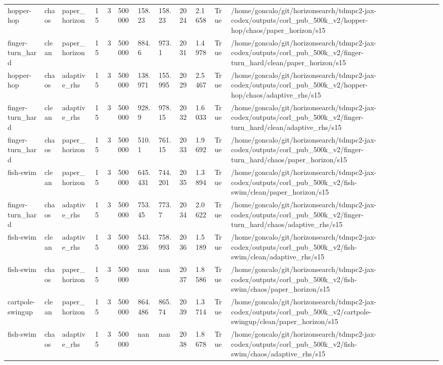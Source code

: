 \begin{tabular}{llllllllllll}
hopper-hop & chaos & paper\_horizon & 15 & 3 & 500000 & 158.23 & 158.23 & 2024 & 2.1658 & True & /home/goncalo/git/horizonsearch/tdmpc2-jax-codex/outputs/corl\_pub\_500k\_v2/hopper-hop/chaos/paper\_horizon/s15 \\
finger-turn\_hard & clean & paper\_horizon & 15 & 3 & 500000 & 884.6 & 973.1 & 2031 & 1.4978 & True & /home/goncalo/git/horizonsearch/tdmpc2-jax-codex/outputs/corl\_pub\_500k\_v2/finger-turn\_hard/clean/paper\_horizon/s15 \\
hopper-hop & chaos & adaptive\_rhs & 15 & 3 & 500000 & 138.971 & 155.995 & 2029 & 2.5467 & True & /home/goncalo/git/horizonsearch/tdmpc2-jax-codex/outputs/corl\_pub\_500k\_v2/hopper-hop/chaos/adaptive\_rhs/s15 \\
finger-turn\_hard & clean & adaptive\_rhs & 15 & 3 & 500000 & 928.9 & 978.15 & 2032 & 1.6033 & True & /home/goncalo/git/horizonsearch/tdmpc2-jax-codex/outputs/corl\_pub\_500k\_v2/finger-turn\_hard/clean/adaptive\_rhs/s15 \\
finger-turn\_hard & chaos & paper\_horizon & 15 & 3 & 500000 & 510.1 & 761.15 & 2033 & 1.9692 & True & /home/goncalo/git/horizonsearch/tdmpc2-jax-codex/outputs/corl\_pub\_500k\_v2/finger-turn\_hard/chaos/paper\_horizon/s15 \\
fish-swim & clean & paper\_horizon & 15 & 3 & 500000 & 645.431 & 744.201 & 2035 & 1.3894 & True & /home/goncalo/git/horizonsearch/tdmpc2-jax-codex/outputs/corl\_pub\_500k\_v2/fish-swim/clean/paper\_horizon/s15 \\
finger-turn\_hard & chaos & adaptive\_rhs & 15 & 3 & 500000 & 753.45 & 773.7 & 2034 & 2.0622 & True & /home/goncalo/git/horizonsearch/tdmpc2-jax-codex/outputs/corl\_pub\_500k\_v2/finger-turn\_hard/chaos/adaptive\_rhs/s15 \\
fish-swim & clean & adaptive\_rhs & 15 & 3 & 500000 & 543.236 & 758.993 & 2036 & 1.5189 & True & /home/goncalo/git/horizonsearch/tdmpc2-jax-codex/outputs/corl\_pub\_500k\_v2/fish-swim/clean/adaptive\_rhs/s15 \\
fish-swim & chaos & paper\_horizon & 15 & 3 & 500000 & nan & nan & 2037 & 1.8586 & True & /home/goncalo/git/horizonsearch/tdmpc2-jax-codex/outputs/corl\_pub\_500k\_v2/fish-swim/chaos/paper\_horizon/s15 \\
cartpole-swingup & clean & paper\_horizon & 15 & 3 & 500000 & 864.486 & 865.74 & 2039 & 1.3714 & True & /home/goncalo/git/horizonsearch/tdmpc2-jax-codex/outputs/corl\_pub\_500k\_v2/cartpole-swingup/clean/paper\_horizon/s15 \\
fish-swim & chaos & adaptive\_rhs & 15 & 3 & 500000 & nan & nan & 2038 & 1.8678 & True & /home/goncalo/git/horizonsearch/tdmpc2-jax-codex/outputs/corl\_pub\_500k\_v2/fish-swim/chaos/adaptive\_rhs/s15 \\

\end{tabular}
